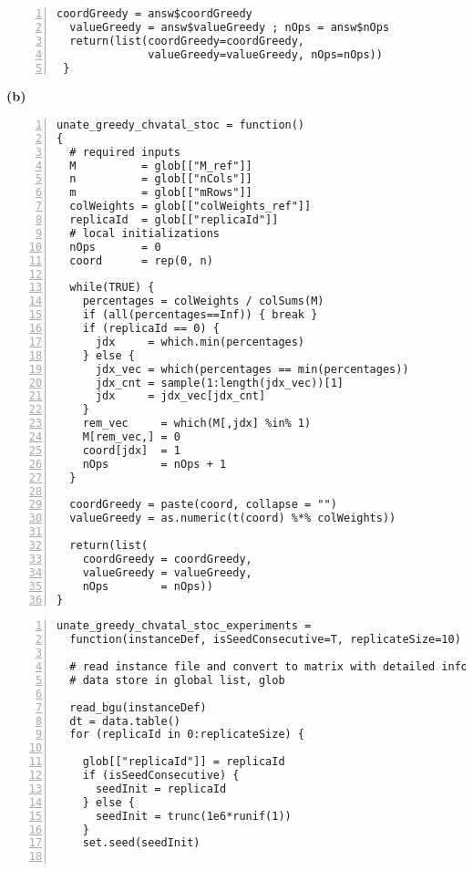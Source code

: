 \begin{figure*}[t!]
\begin{minipage}{0.51\textwidth}
\begin{Verbatim}[frame=lines, fontsize=\footnotesize,numbers=left,
numbersep=3pt,firstline=1,xleftmargin=9mm]
  coordGreedy = answ$coordGreedy
  valueGreedy = answ$valueGreedy ; nOps = answ$nOps
  return(list(coordGreedy=coordGreedy, 
              valueGreedy=valueGreedy, nOps=nOps))
 }
  \end{Verbatim}
\end{minipage}
%
\begin{minipage}{0.51\textwidth}
\centering

{\large\bf  (b) }
\vspace*{-1ex} 
\begin{Verbatim}[frame=lines, fontsize=\footnotesize,numbers=left,
numbersep=3pt,firstline=1,xleftmargin=9mm]
unate_greedy_chvatal_stoc = function() 
{
  # required inputs
  M          = glob[["M_ref"]]
  n          = glob[["nCols"]]
  m          = glob[["mRows"]]
  colWeights = glob[["colWeights_ref"]]
  replicaId  = glob[["replicaId"]]
  # local initializations
  nOps       = 0
  coord      = rep(0, n)
  
  while(TRUE) {
    percentages = colWeights / colSums(M)
    if (all(percentages==Inf)) { break }
    if (replicaId == 0) {
      jdx     = which.min(percentages)
    } else {
      jdx_vec = which(percentages == min(percentages))
      jdx_cnt = sample(1:length(jdx_vec))[1]
      jdx     = jdx_vec[jdx_cnt]         
    }
    rem_vec     = which(M[,jdx] %in% 1)
    M[rem_vec,] = 0
    coord[jdx]  = 1
    nOps        = nOps + 1
  }
  
  coordGreedy = paste(coord, collapse = "")
  valueGreedy = as.numeric(t(coord) %*% colWeights))
  
  return(list(
    coordGreedy = coordGreedy, 
    valueGreedy = valueGreedy,
    nOps        = nOps))
}
\end{Verbatim}
\vspace*{-6.5ex}
\begin{Verbatim}[frame=lines, fontsize=\footnotesize,numbers=left,
numbersep=3pt,firstline=1,xleftmargin=9mm]
unate_greedy_chvatal_stoc_experiments = 
  function(instanceDef, isSeedConsecutive=T, replicateSize=10) {
  
  # read instance file and convert to matrix with detailed info
  # data store in global list, glob
  
  read_bgu(instanceDef)
  dt = data.table()
  for (replicaId in 0:replicateSize) {
    
    glob[["replicaId"]] = replicaId
    if (isSeedConsecutive) {
      seedInit = replicaId 
    } else {
      seedInit = trunc(1e6*runif(1)) 
    }
    set.seed(seedInit)
    

\end{Verbatim}
\end{minipage}
\end{figure*}
